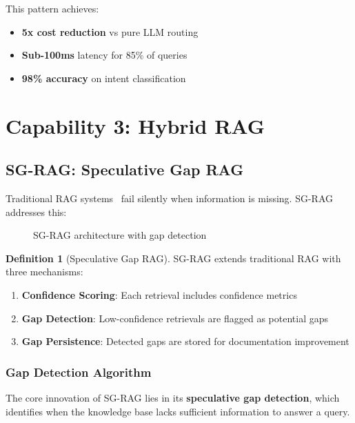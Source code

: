 \documentclass[11pt,a4paper]{article}
\theoremstyle{definition}
\newtheorem{definition}{Definition}[section]
\theoremstyle{remark}
\newcommand{\sgrag}{\textsc{SG-RAG}\xspace}
\begin{document}
This pattern achieves:
\begin{itemize}
    \item \textbf{5x cost reduction} vs pure LLM routing
    \item \textbf{Sub-100ms} latency for 85\% of queries
    \item \textbf{98\% accuracy} on intent classification
\end{itemize}

\section{Capability 3: Hybrid RAG}
\label{sec:rag}

\subsection{SG-RAG: Speculative Gap RAG}

Traditional RAG systems~\cite{lewis2020retrieval,gao2023retrieval} fail silently when information is missing. \sgrag addresses this:

\begin{figure}[H]
    \centering
    
    \caption{\sgrag architecture with gap detection}
    \label{fig:sgrag}
\end{figure}

\begin{definition}[Speculative Gap RAG]
\sgrag extends traditional RAG with three mechanisms:
\begin{enumerate}
    \item \textbf{Confidence Scoring}: Each retrieval includes confidence metrics
    \item \textbf{Gap Detection}: Low-confidence retrievals are flagged as potential gaps
    \item \textbf{Gap Persistence}: Detected gaps are stored for documentation improvement
\end{enumerate}
\end{definition}

\subsubsection{Gap Detection Algorithm}

The core innovation of \sgrag lies in its \textbf{speculative gap detection}, which identifies when the knowledge base lacks sufficient information to answer a query.
\end{document}
